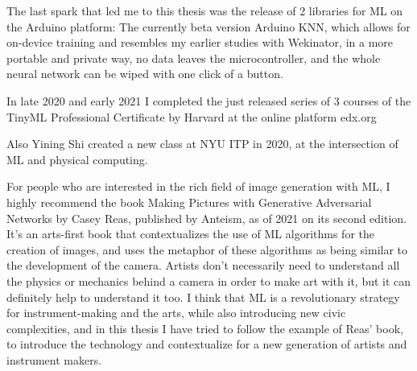 The last spark that led me to this thesis was the release of 2 libraries for \acrshort{ML} on the Arduino platform: The currently beta version Arduino KNN, which allows for on-device training and resembles my earlier studies with Wekinator, in a more portable and private way, no data leaves the microcontroller, and the whole neural network can be wiped with one click of a button.

In late 2020 and early 2021 I completed the just released series of 3 courses of the TinyML Professional Certificate by Harvard at the online platform edx.org

Also Yining Shi created a new class at \acrshort{NYU} \acrshort{ITP} in 2020, at the intersection of \acrshort{ML} and physical computing.

For people who are interested in the rich field of image generation with \acrshort{ML}, I highly recommend the book Making Pictures with Generative Adversarial Networks \cite{making-pictures-with-gans} by Casey Reas, published by Anteism, as of 2021 on its second edition. It’s an arts-first book that contextualizes the use of \acrshort{ML} algorithms for the creation of images, and uses the metaphor of these algorithms as being similar to the development of the camera. Artists don’t necessarily need to understand all the physics or mechanics behind a camera in order to make art with it, but it can definitely help to understand it too. I think that \acrshort{ML} is a revolutionary strategy for instrument-making and the arts, while also introducing new civic complexities, and in this thesis I have tried to follow the example of Reas' book, to introduce the technology and contextualize for a new generation of artists and instrument makers.
